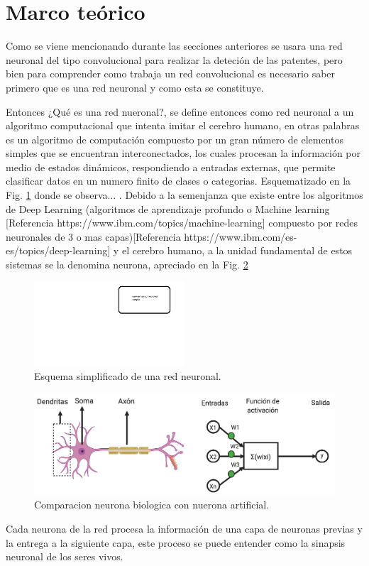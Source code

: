\section{Marco teórico}
Como se viene mencionando durante las secciones anteriores se usara una red neuronal del tipo convolucional para realizar la deteción de las patentes,
pero bien para comprender como trabaja un red convolucional es necesario saber primero que es una red neuronal y como esta se constituye.

Entonces ¿Qué es una red nueronal?, se define entonces como red neuronal a un algoritmo computacional que intenta imitar el cerebro
humano, en otras palabras es un algoritmo de computación compuesto por un gran número de elementos simples que se
encuentran interconectados, los cuales procesan la información por medio de estados dinámicos, respondiendo a entradas externas, que permite
clasificar datos en un numero finito de clases o categorias. Esquematizado en
la Fig. \ref{fig:esquema-redes} donde se observa... .
Debido a la semenjanza que existe entre los algoritmos de Deep Learning (algoritmos de aprendizaje profundo o
Machine learning [Referencia https://www.ibm.com/topics/machine-learning] compuesto por redes neuronales
de 3 o mas capas)[Referencia https://www.ibm.com/es-es/topics/deep-learning] y el cerebro humano, a la
unidad fundamental de estos sistemas se la denomina neurona, apreciado en la Fig. \ref{fig:comparativa-neuronas}
\begin{figure}[h]
    \centering
    \includegraphics[width=0.5\textwidth]{imgs/Redes-esquema.jpg}
    \caption{Esquema simplificado de una red neuronal.}
    \label{fig:esquema-redes}
\end{figure}

\begin{figure}[h]
    \centering
    \includegraphics[width=1\textwidth]{imgs/comparacion-neurona-red.png}
    \caption{Comparacion neurona biologica con nuerona artificial.}
    \label{fig:comparativa-neuronas}
\end{figure}
Cada neurona de la red procesa la información de una capa de neuronas previas y la entrega a la siguiente capa, este proceso se puede entender como la sinapsis neuronal de los seres vivos.

